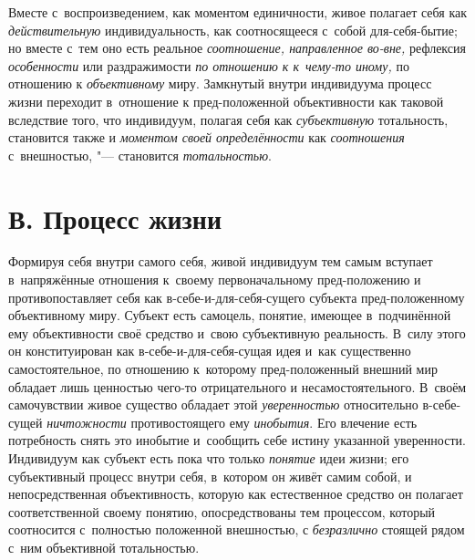 Вместе с~воспроизведением, как моментом единичности, живое
полагает себя как {\em действительную}
индивидуальность, как соотносящееся с~собой для-себя-бытие;
но вместе с~тем оно есть реальное
{\em соотношение, направленное во-вне,}
рефлексия
{\em особенности} или
раздражимости {\em по отношению к
к~чему-то иному,} по отношению к
{\em объективному} миру.
Замкнутый внутри индивидуума процесс жизни переходит в~отношение к
пред-положенной объективности как таковой вследствие того, что
индивидуум, полагая себя как
{\em субъективную}
тотальность, становится также и
{\em моментом своей определённости}
как {\em соотношения}
с~внешностью, "--- становится
{\em тотальностью}.

\section[В. Процесс жизни]{В. Процесс жизни}

Формируя себя внутри самого себя, живой индивидуум тем самым
вступает в~напряжённые отношения к~своему первоначальному пред-положению и
противопоставляет себя как в-себе-и-для-себя-сущего субъекта
пред-положенному объективному миру. Субъект есть самоцель, понятие, имеющее
в~подчинённой ему объективности своё средство и~свою субъективную
реальность. В~силу этого он конституирован как в-себе-и-для-себя-сущая идея
и~как существенно самостоятельное, по отношению к~которому пред-положенный
внешний мир обладает лишь ценностью чего-то отрицательного и
несамостоятельного. В~своём самочувствии живое существо обладает этой
{\em уверенностью}
относительно в-себе-сущей
{\em ничтожности}
противостоящего ему
{\em инобытия}. Его
влечение есть потребность снять это инобытие и~сообщить себе истину
указанной уверенности. Индивидуум как субъект есть пока что только
{\em понятие} идеи жизни;
его субъективный процесс внутри себя, в~котором он живёт самим собой, и
непосредственная объективность, которую как естественное средство он
полагает соответственной своему понятию, опосредствованы тем процессом,
который соотносится с~полностью положенной внешностью, с
{\em безразлично} стоящей
рядом с~ним объективной тотальностью.

